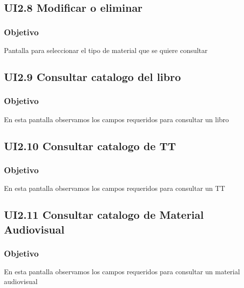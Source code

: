 \newpage
\subsection{UI2.8 Modificar o eliminar}

\subsubsection{Objetivo}
	Pantalla para seleccionar el tipo de material que se quiere consultar



\newpage
\subsection{UI2.9 Consultar catalogo del libro}

\subsubsection{Objetivo}
	En esta pantalla observamos los campos requeridos para consultar un libro



\newpage
\subsection{UI2.10 Consultar catalogo de TT}

\subsubsection{Objetivo}
	En esta pantalla observamos los campos requeridos para consultar un TT


\newpage
\subsection{UI2.11 Consultar catalogo de Material Audiovisual}

\subsubsection{Objetivo}
	En esta pantalla observamos los campos requeridos para consultar un material audiovisual

